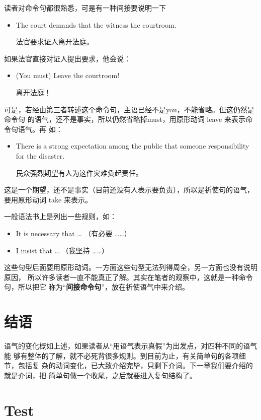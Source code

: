 读者对命令句都很熟悉，可是有一种间接要说明一下
\begin{itemize}
\item The court demands that the witness  the courtroom.

  法官要求证人离开法庭。
\end{itemize}

如果法官直接对证人提出要求，他会说：
\begin{itemize}
\item  (You must) Leave the courtroom!

  离开法庭！
\end{itemize}
可是，若经由第三者转述这个命令句，主语已经不是you，不能省略。但这仍然是命令句
的语气，还不是事实，所以仍然省略掉must，用原形动词 leave 来表示命令句语气。再
如：
\begin{itemize}
\item There is a strong expectation among the public that someone 
  responsibility for the disaster.

  民众强烈期望有人为这件灾难负起责任。
\end{itemize}
这是一个期望，还不是事实（目前还没有人表示要负责），所以是祈使句的语气，要用原形动词
take 来表示。

一般语法书上是列出一些规则，如：
\begin{itemize}
\item  It is necessary that \ldots{} （有必要 \ldots \ldots）
\item  I insist that \ldots{} （我坚持 \ldots \ldots）
\end{itemize}

这些句型后面要用原形动词。一方面这些句型无法列得周全，另一方面也没有说明原因，
所以许多读者一直不能真正了解。其实在笔者的观察中，这就是一种命令句，所以把它
称为“\textbf{间接命令句}”，放在祈使语气中来介绍。

\section{结语}

语气的变化概如上述，如果读者从“用语气表示真假”为出发点，对四种不同的语气能
够有整体的了解，就不必死背很多规则。到目前为止，有关简单句的各项细节，包括复
杂的动词变化，已大致介绍完毕，只剩下介词。下一章我们要介绍的就是介词，把
简单句做一个收尾，之后就要进入复句结构了。

\section{Test}

